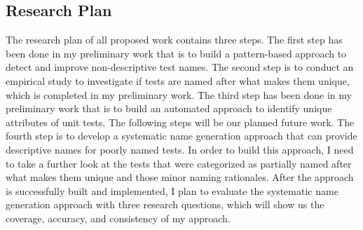 \subsection{Research Plan}

The research plan of all proposed work contains three steps.
%
The first step has been done in my preliminary work that is to build a pattern-based approach to detect and improve non-descriptive test names.
%
The second step is to conduct an empirical study to investigate if tests are named after what makes them unique, which is completed in my preliminary work.
%
The third step has been done in my preliminary work that is to build an automated approach to identify unique attributes of unit tests.
%
The following steps will be our planned future work.
%
The fourth step is to develop a systematic name generation approach that can provide descriptive names for poorly named tests.
%
In order to build this approach, I need to take a further look at the tests that were categorized as partially named after what makes them unique and those minor naming rationales.
%
After the approach is successfully built and implemented, I plan to evaluate the systematic name generation approach with three research questions, which will show us the coverage, accuracy, and consistency of my approach.